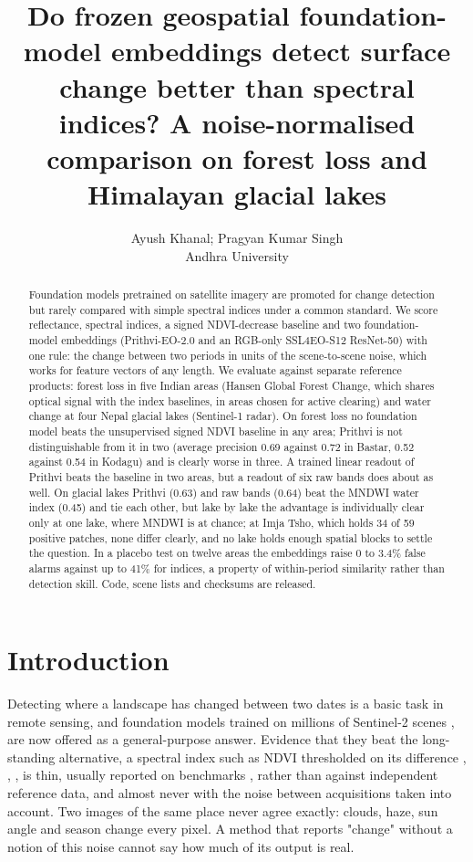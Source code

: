 \documentclass[11pt]{article}
\title{Do frozen geospatial foundation-model embeddings detect surface change better than spectral indices? A noise-normalised comparison on forest loss and Himalayan glacial lakes}
\author{Ayush Khanal; Pragyan Kumar Singh\\ \small Andhra University}
\date{}
\begin{document}
\maketitle
\begin{abstract}

Foundation models pretrained on satellite imagery are promoted for change detection but rarely compared with simple spectral indices under a common standard. We score reflectance, spectral indices, a signed NDVI-decrease baseline and two foundation-model embeddings (Prithvi-EO-2.0 and an RGB-only SSL4EO-S12 ResNet-50) with one rule: the change between two periods in units of the scene-to-scene noise, which works for feature vectors of any length. We evaluate against separate reference products: forest loss in five Indian areas (Hansen Global Forest Change, which shares optical signal with the index baselines, in areas chosen for active clearing) and water change at four Nepal glacial lakes (Sentinel-1 radar). On forest loss no foundation model beats the unsupervised signed NDVI baseline in any area; Prithvi is not distinguishable from it in two (average precision 0.69 against 0.72 in Bastar, 0.52 against 0.54 in Kodagu) and is clearly worse in three. A trained linear readout of Prithvi beats the baseline in two areas, but a readout of six raw bands does about as well. On glacial lakes Prithvi (0.63) and raw bands (0.64) beat the MNDWI water index (0.45) and tie each other, but lake by lake the advantage is individually clear only at one lake, where MNDWI is at chance; at Imja Tsho, which holds 34 of 59 positive patches, none differ clearly, and no lake holds enough spatial blocks to settle the question. In a placebo test on twelve areas the embeddings raise 0 to 3.4\% false alarms against up to 41\% for indices, a property of within-period similarity rather than detection skill. Code, scene lists and checksums are released.

\end{abstract}

\section{Introduction}

Detecting where a landscape has changed between two dates is a basic task in remote sensing, and foundation models trained on millions of Sentinel-2 scenes \cite{szwarcman2024}, \cite{wang2022ssl4eo} are now offered as a general-purpose answer. Evidence that they beat the long-standing alternative, a spectral index such as NDVI thresholded on its difference \cite{singh1989}, \cite{bruzzone2000}, \cite{coppin2004}, is thin, usually reported on benchmarks \cite{lacoste2023}, \cite{marsocci2024} rather than against independent reference data, and almost never with the noise between acquisitions taken into account. Two images of the same place never agree exactly: clouds, haze, sun angle and season change every pixel. A method that reports "change" without a notion of this noise cannot say how much of its output is real.
\end{document}
